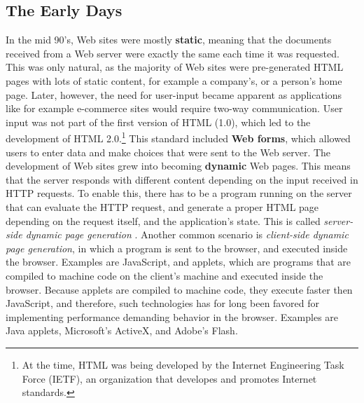 \subsection{The Early Days}
In the mid 90's, Web sites were mostly \textbf{static}, meaning that the documents received from a Web server were exactly the same each time it was requested. This was only natural, as the majority of Web sites were pre-generated HTML pages with lots of static content, for example a company's, or a person's home page. Later, however, the need for user-input became apparent as applications like for example e-commerce sites would require two-way communication. User input was not part of the first version of HTML (1.0), which led to the development of HTML 2.0.\footnote{At the time, HTML was being developed by the Internet Engineering Task Force (IETF)\cite{ietf}, an organization that developes and promotes Internet standards.} This standard included \textbf{Web forms}, which allowed users to enter data and make choices that were sent to the Web server. The development of Web sites grew into becoming \textbf{dynamic} Web pages. This means that the server responds with different content depending on the input received in HTTP requests. To enable this, there has to be a program running on the server that can evaluate the HTTP request, and generate a proper HTML page depending on the request itself, and the application's state. This is called \textit{server-side dynamic page generation} \cite[p.691]{tanumbaum}. Another common scenario is \textit{client-side dynamic page generation}, in which a program is sent to the browser, and executed inside the browser. Examples are JavaScript, and applets, which are programs that are compiled to machine code on the client's machine and executed inside the browser. Because applets are compiled to machine code, they execute faster then JavaScript, and therefore, such technologies has for long been favored for implementing performance demanding behavior in the browser. Examples are Java applets, Microsoft's ActiveX\cite{activex}, and Adobe's Flash\cite{flash}. 

